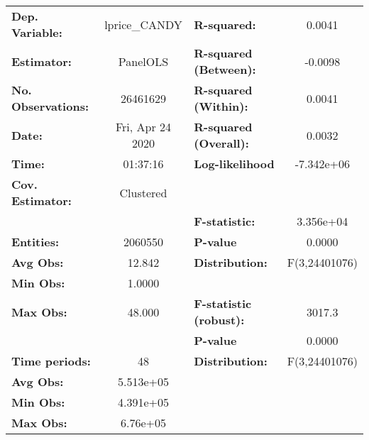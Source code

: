 \documentclass{report}
\begin{document}
\begin{center}
\begin{tabular}{lclc}
\toprule
\textbf{Dep. Variable:}       &   lprice\_CANDY    & \textbf{  R-squared:         }   &      0.0041      \\
\textbf{Estimator:}           &      PanelOLS      & \textbf{  R-squared (Between):}  &     -0.0098      \\
\textbf{No. Observations:}    &      26461629      & \textbf{  R-squared (Within):}   &      0.0041      \\
\textbf{Date:}                &  Fri, Apr 24 2020  & \textbf{  R-squared (Overall):}  &      0.0032      \\
\textbf{Time:}                &      01:37:16      & \textbf{  Log-likelihood     }   &    -7.342e+06    \\
\textbf{Cov. Estimator:}      &     Clustered      & \textbf{                     }   &                  \\
\textbf{}                     &                    & \textbf{  F-statistic:       }   &    3.356e+04     \\
\textbf{Entities:}            &      2060550       & \textbf{  P-value            }   &      0.0000      \\
\textbf{Avg Obs:}             &       12.842       & \textbf{  Distribution:      }   &  F(3,24401076)   \\
\textbf{Min Obs:}             &       1.0000       & \textbf{                     }   &                  \\
\textbf{Max Obs:}             &       48.000       & \textbf{  F-statistic (robust):} &      3017.3      \\
\textbf{}                     &                    & \textbf{  P-value            }   &      0.0000      \\
\textbf{Time periods:}        &         48         & \textbf{  Distribution:      }   &  F(3,24401076)   \\
\textbf{Avg Obs:}             &     5.513e+05      & \textbf{                     }   &                  \\
\textbf{Min Obs:}             &     4.391e+05      & \textbf{                     }   &                  \\
\textbf{Max Obs:}             &      6.76e+05      & \textbf{                     }   &                  \\
\bottomrule
\end{tabular}
\begin{tabular}{lcccccc}

\end{tabular}
\end{center}
\end{document}
